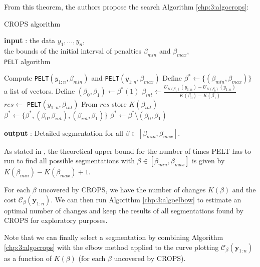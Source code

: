 From this theorem, the authors propose the search Algorithm \ref{chp:3:algocrops}:

\begin{algorithm}[ht]
\caption{CROPS algorithm}\label{chp:3:algocrops}
\begin{algorithmic}

\State \textbf{input} : the data $y_{1},...,y_{n}$, \\
the bounds of the initial interval of penalties $\beta_{min}$ and $\beta_{max}$, \\
\texttt{PELT} algorithm 
  
\State Compute \texttt{PELT}$(y_{1:n},\beta_{min})$ and \texttt{PELT}$(y_{1:n},\beta_{max})$ 
\State Define $\beta^* \gets \{(\beta_{min},\beta_{max})\}$ a list of vectors.  
\While{$\beta^*\neq \emptyset$}
  \State Define $(\beta_0, \beta_1) \gets \beta^*(1)$
    \State $\beta_{int} \gets \frac{U_{K(\beta_1)}(y_{1:n})-U_{K(\beta_0)}(y_{1:n})}{K(\beta_0)-K(\beta_1)}$
    \State $res \gets$ \texttt{PELT}$(y_{1:n},\beta_{int})$
    \State From $res$ store $K(\beta_{int})$
      \State $\beta^* \gets \{\beta^*,(\beta_0,\beta_{int}),(\beta_{int},\beta_1)\}$
    \EndIf
  \EndIf
  \State $\beta^* \gets \beta^*$\textbackslash$(\beta_0,\beta_1)$
\EndWhile 
   
\State \textbf{output} : Detailed segmentation for all $\beta \in [\beta_{min},\beta_{max}]$. 
\end{algorithmic}
\end{algorithm} 


As stated in \cite{haynes2017}, the theoretical upper bound for the number of times PELT has to run to find all possible segmentations with $\beta\in[\beta_{min},\beta_{max}]$ is given by $K(\beta_{min})-K(\beta_{max})+1$. 

For each $\beta$ uncovered by CROPS, we have the number of changes $K(\beta)$ and the cost $\mathcal{C}_{\beta}(\bm y_{1:n})$. We can then run Algorithm \ref{chp:3:algoelbow} to estimate an optimal number of changes and keep the results of all segmentations found by CROPS for exploratory purposes. 

Note that we can finally select a segmentation by combining Algorithm \ref{chp:3:algocrops} with the elbow method applied to the curve plotting $\mathcal{C}_{\beta}(\bm y_{1:n})$ as a function of $K(\beta)$ (for each $\beta$ uncovered by CROPS).  

